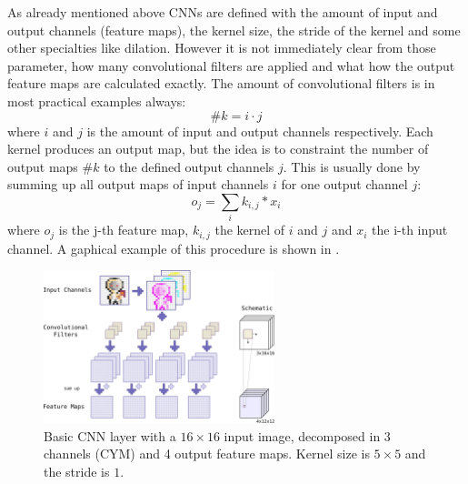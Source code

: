 As already mentioned above CNNs are defined with the amount of input and output channels (feature maps), the kernel size, the stride of the kernel and some other specialties like dilation.
However it is not immediately clear from those parameter, how many convolutional filters are applied and what how the output feature maps are calculated exactly.
The amount of convolutional filters is in most practical examples always:
\begin{equation}\label{eq:nn_theory_n_filters}
  \#k = i \cdot j
\end{equation}
where $i$ and $j$ is the amount of input and output channels respectively.
Each kernel produces an output map, but the idea is to constraint the number of output maps $\#k$ to the defined output channels $j$.
This is usually done by summing up all output maps of input channels $i$ for one output channel $j$:
\begin{equation}
  o_j = \sum_{i} k_{i, j} * x_i
\end{equation}
where $o_j$ is the j-th feature map, $k_{i, j}$ the kernel of $i$ and $j$ and $x_i$ the i-th input channel.
A gaphical example of this procedure is shown in .
\begin{figure}[!ht]
  \centering
    \includegraphics[width=0.6\textwidth]{./4_nn/figs/nn_theory_cnn_basics.eps}
  \caption{Basic CNN layer with a $16 \times 16$ input image, decomposed in 3 channels (CYM) and 4 output feature maps. Kernel size is $5 \times 5$ and the stride is $1$.}
  \label{fig:nn_theory_cnn_basics}
\end{figure}
\FloatBarrier
\noindent



